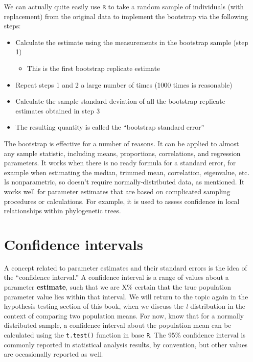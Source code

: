 \documentclass[]{book}
\providecommand{\tightlist}{%
  \setlength{\itemsep}{0pt}\setlength{\parskip}{0pt}}
\begin{document}
We can actually quite easily use \texttt{R} to take a random sample of individuals (with replacement) from the original data to implement the bootstrap via the following steps:

\begin{itemize}
\tightlist
\item
  Calculate the estimate using the measurements in the bootstrap sample (step 1)

  \begin{itemize}
  \tightlist
  \item
    This is the first bootstrap replicate estimate
  \end{itemize}
\item
  Repeat steps 1 and 2 a large number of times (1000 times is reasonable)
\item
  Calculate the sample standard deviation of all the bootstrap replicate estimates obtained in step 3
\item
  The resulting quantity is called the ``bootstrap standard error''
\end{itemize}

The bootstrap is effective for a number of reasons. It can be applied to almost any sample statistic, including means, proportions, correlations, and regression parameters. It works when there is no ready formula for a standard error, for example when estimating the median, trimmed mean, correlation, eigenvalue, etc. Is nonparametric, so doesn't require normally-distributed data, as mentioned. It works well for parameter estimates that are based on complicated sampling procedures or calculations. For example, it is used to assess confidence in local relationships within phylogenetic trees.

\hypertarget{confidence-intervals}{%
\section{Confidence intervals}\label{confidence-intervals}}

A concept related to parameter estimates and their standard errors is the idea of the ``confidence interval.'' A confidence interval is a range of values about a parameter \textbf{estimate}, such that we are X\% certain that the true population parameter value lies within that interval. We will return to the topic again in the hypothesis testing section of this book, when we discuss the \emph{t} distribution in the context of comparing two population means. For now, know that for a normally distributed sample, a confidence interval about the population mean can be calculated using the \texttt{t.test()} function in base \texttt{R}. The 95\% confidence interval is commonly reported in statistical analysis results, by convention, but other values are occasionally reported as well.
\end{document}
